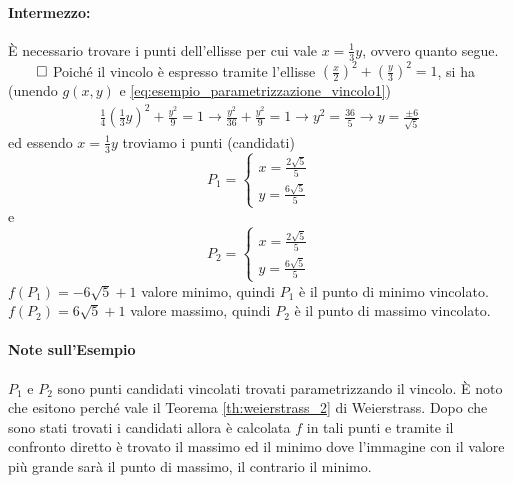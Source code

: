 \begin{example}
	\paragraph{Intermezzo:} È necessario trovare i punti dell'ellisse per cui vale $x=\frac{1}{3} y$, ovvero quanto segue. $\qed$
	Poiché il vincolo è espresso tramite l'ellisse $\left(\frac{x}{2}\right)^2 + \left(\frac{y}{3}\right)^2 = 1$, si ha (unendo $g(x,y)$ e \ref{eq:esempio_parametrizzazione_vincolo1})
	\begin{equation*}
		\begin{matrix}
			\frac{1}{4}\left(\frac{1}{3}y\right)^2 + \frac{y^2}{9} = 1 \rightarrow \frac{y^2}{36} + \frac{y^2}{9} = 1 \rightarrow y^2 = \frac{36}{5} \rightarrow y = \frac{\pm 6}{\sqrt{5}}
		\end{matrix}
	\end{equation*}
	ed essendo $x=\frac{1}{3}y$ troviamo i punti (candidati)
	\begin{equation*}
		P_1 = \begin{cases}
			x=\frac{2\sqrt{5}}{5}\\
			y=\frac{6\sqrt{5}}{5}
		\end{cases}
	\end{equation*}
	e
	\begin{equation*}
		P_2 = \begin{cases}
			x=\frac{2\sqrt{5}}{5}\\
			y=\frac{6\sqrt{5}}{5}
		\end{cases}
	\end{equation*}
	$f(P_1) = -6 \sqrt{5} +1$ valore minimo, quindi $P_1$ è il punto di minimo vincolato.\\
	$f(P_2) = 6 \sqrt{5} +1$ valore massimo, quindi $P_2$ è il punto di massimo vincolato.
	\end{example}
	
\paragraph{Note sull'Esempio} $P_1$ e $P_2$ sono punti candidati vincolati trovati parametrizzando il vincolo. È noto che esitono perché vale il Teorema \ref{th:weierstrass_2} di Weierstrass. Dopo che sono stati trovati i candidati allora è calcolata $f$ in tali punti e tramite il confronto diretto è trovato il massimo ed il minimo dove l'immagine con il valore più grande sarà il punto di massimo, il contrario il minimo.

